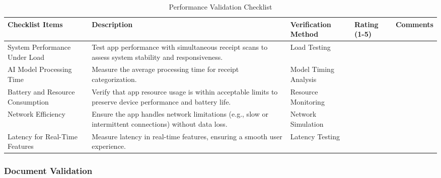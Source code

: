 \documentclass[12pt, titlepage]{article}
\begin{document}
\begin{table}[h!]
\caption{Performance Validation Checklist}
\noindent \begin{tabular}{|>{\raggedright\arraybackslash}p{3cm}|>{\raggedright\arraybackslash}p{4cm}|>{\raggedright\arraybackslash}p{3cm}|p{1cm}|p{2.25cm}|}
	\hline
	\textbf{Checklist Items} & \textbf{Description} & \textbf{Verification Method} & \textbf{Rating (1-5)} & \textbf{Comments} \\ 
	\hline
	System Performance Under Load & Test app performance with simultaneous receipt scans to assess system stability and responsiveness.	& Load Testing & & \\
	\hline
	AI Model Processing Time & Measure the average processing time for receipt categorization. & Model Timing Analysis & & \\
	\hline
	Battery and Resource Consumption & Verify that app resource usage is within acceptable limits to preserve device performance and battery life. & Resource Monitoring & & \\
	\hline
	Network Efficiency & Ensure the app handles network limitations (e.g., slow or intermittent connections) without data loss.	& Network Simulation & & \\
	\hline
	Latency for Real-Time Features & Measure latency in real-time features, ensuring a smooth user experience. & Latency Testing & & \\
	\hline
\end{tabular}
\end{table}

\newpage

\subsubsection{Document Validation}
\end{document}
